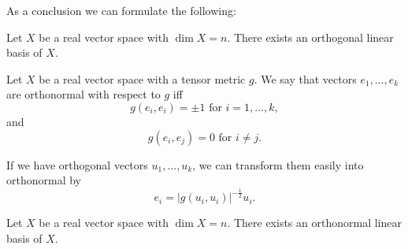 \documentclass[main.tex]{subfiles}
\begin{document}
As a conclusion we can formulate the following:
\begin{theorem}
Let $X$ be a real vector space with $\dim X = n$. There exists an orthogonal linear basis of $X$. 
\end{theorem}

\begin{definition}
Let $X$ be a real vector space with a tensor metric $g$.
We say that vectors $e_1, \dots, e_k$ are orthonormal with respect to $g$ iff 
\begin{equation}
g(e_i, e_i) =  \pm 1 \text{ for } i=1, \dots, k,
\end{equation}
and
\begin{equation}
g(e_i, e_j) = 0 \text{ for } i\not=j. 
\end{equation}
\end{definition}
If we have orthogonal vectors $u_1, \dots, u_k$, we can transform them easily into orthonormal by
\begin{equation}
e_i = |g(u_i, u_i)|^{-\frac{1}{2}} u_i.
\end{equation}

\begin{corollary}
Let $X$ be a real vector space with $\dim X = n$. There exists an orthonormal linear basis of $X$. 
\end{corollary}
\end{document}
